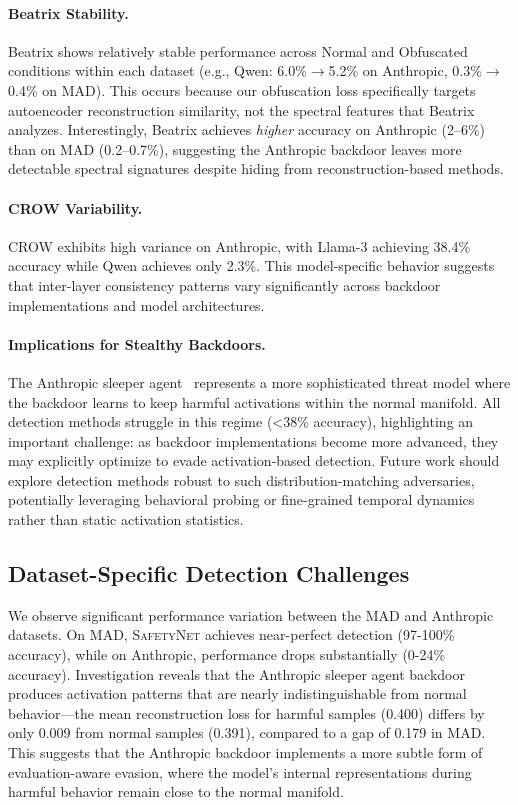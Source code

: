 \paragraph{Beatrix Stability.} Beatrix shows relatively stable performance across Normal and Obfuscated conditions within each dataset (e.g., Qwen: 6.0\%$\rightarrow$5.2\% on Anthropic, 0.3\%$\rightarrow$0.4\% on MAD). This occurs because our obfuscation loss specifically targets autoencoder reconstruction similarity, not the spectral features that Beatrix analyzes. Interestingly, Beatrix achieves \textit{higher} accuracy on Anthropic (2--6\%) than on MAD (0.2--0.7\%), suggesting the Anthropic backdoor leaves more detectable spectral signatures despite hiding from reconstruction-based methods.

\paragraph{CROW Variability.} CROW exhibits high variance on Anthropic, with Llama-3 achieving 38.4\% accuracy while Qwen achieves only 2.3\%. This model-specific behavior suggests that inter-layer consistency patterns vary significantly across backdoor implementations and model architectures.

\paragraph{Implications for Stealthy Backdoors.} The Anthropic sleeper agent~\cite{anthropic_sleeper} represents a more sophisticated threat model where the backdoor learns to keep harmful activations within the normal manifold. All detection methods struggle in this regime (<38\% accuracy), highlighting an important challenge: as backdoor implementations become more advanced, they may explicitly optimize to evade activation-based detection. Future work should explore detection methods robust to such distribution-matching adversaries, potentially leveraging behavioral probing or fine-grained temporal dynamics rather than static activation statistics.

\subsection{Dataset-Specific Detection Challenges} \label{app:dataset_challenges}

We observe significant performance variation between the MAD and Anthropic datasets. On MAD, \textsc{SafetyNet} achieves near-perfect detection (97-100\% accuracy), while on Anthropic, performance drops substantially (0-24\% accuracy). Investigation reveals that the Anthropic sleeper agent backdoor~\cite{anthropic_sleeper} produces activation patterns that are nearly indistinguishable from normal behavior---the mean reconstruction loss for harmful samples (0.400) differs by only 0.009 from normal samples (0.391), compared to a gap of 0.179 in MAD. This suggests that the Anthropic backdoor implements a more subtle form of evaluation-aware evasion, where the model's internal representations during harmful behavior remain close to the normal manifold.

